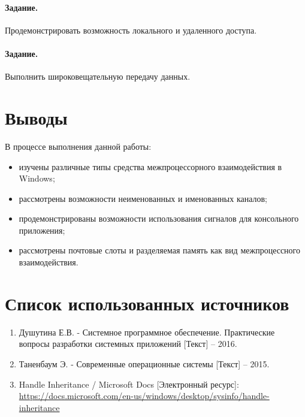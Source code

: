 \paragraph{Задание.} Продемонстрировать возможность локального и удаленного доступа.

\paragraph{Задание.} Выполнить широковещательную передачу данных.

\section{Выводы}

В процессе выполнения данной работы:

\begin{itemize}
	\item изучены различные типы средства межпроцессорного взаимодействия в Windows;
	\item рассмотрены возможности неименованных и именованных каналов;
	\item продемонстрированы возможности использования сигналов для консольного приложения; 
	\item рассмотрены почтовые слоты и разделяемая память как вид межпроцессного взаимодействия.
\end{itemize}

\section*{Список использованных источников}

\begin{enumerate}
	\item Душутина Е.В. - Системное программное обеспечение. Практические вопросы разработки системных приложений [Текст] -- 2016.
	\item Таненбаум Э. - Современные операционные системы [Текст] -- 2015.
	\item Handle Inheritance / Microsoft Docs [Электронный ресурс]:\\
		{\small\url{https://docs.microsoft.com/en-us/windows/desktop/sysinfo/handle-inheritance}} 
\end{enumerate}


